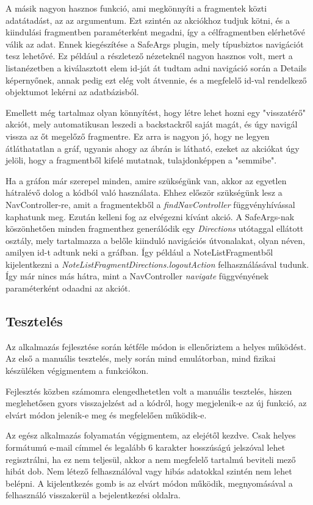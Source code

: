 A másik nagyon hasznos funkció, ami megkönnyíti a fragmentek közti adatátadást, az az argumentum. Ezt szintén az akciókhoz tudjuk kötni, és a kiindulási fragmentben paraméterként megadni, így a célfragmentben elérhetővé válik az adat. Ennek kiegészítése a SafeArgs plugin, mely típusbiztos navigációt tesz lehetővé. Ez például a részletező nézeteknél nagyon hasznos volt, mert a listanézetben a kiválasztott elem id-ját át tudtam adni navigáció során a Details képernyőnek, annak pedig ezt elég volt átvennie, és a megfelelő id-val rendelkező objektumot lekérni az adatbázisból. 

Emellett még tartalmaz olyan könnyítést, hogy létre lehet hozni egy "visszatérő" akciót, mely automatikusan leszedi a backstackről saját magát, és úgy navigál vissza az őt megelőző fragmentre. Ez arra is nagyon jó, hogy ne legyen átláthatatlan a gráf, ugyanis ahogy az ábrán is látható, ezeket az akciókat úgy jelöli, hogy a fragmentből kifelé mutatnak, tulajdonképpen a "semmibe".

Ha a gráfon már szerepel minden, amire szükségünk van, akkor az egyetlen hátralévő dolog a kódból való használata. Ehhez először szükségünk lesz a NavController-re, amit a fragmentekből a \emph{findNavController} függvényhívással kaphatunk meg. Ezután kelleni fog az elvégezni kívánt akció. A SafeArgs-nak köszönhetően minden fragmenthez generálódik egy \emph{Directions} utótaggal ellátott osztály, mely tartalmazza a belőle kiinduló navigációs útvonalakat, olyan néven, amilyen id-t adtunk neki a gráfban. Így például a NoteListFragmentből kijelentkezni a \emph{NoteListFragmentDirections.logoutAction} felhasználásával tudunk. Így már nincs más hátra, mint a NavController \emph{navigate} függvényének paraméterként odaadni az akciót.

\subsection{Tesztelés}
Az alkalmazás fejlesztése során kétféle módon is ellenőriztem a helyes működést. Az első a manuális tesztelés, mely során mind emulátorban, mind fizikai készüléken végigmentem a funkciókon.

Fejlesztés közben számomra elengedhetetlen volt a manuális tesztelés, hiszen meglehetősen gyors visszajelzést ad a kódról, hogy megjelenik-e az új funkció, az elvárt módon jelenik-e meg és megfelelően működik-e. 

Az egész alkalmazás folyamatán végigmentem, az elejétől kezdve. Csak helyes formátumú e-mail címmel és legalább 6 karakter hosszúságú jelszóval lehet regisztrálni, ha ez nem teljesül, akkor a nem megfelelő tartalmú beviteli mező hibát dob. Nem létező felhasználóval vagy hibás adatokkal szintén nem lehet belépni. A kijelentkezés gomb is az elvárt módon működik, megnyomásával a felhasználó visszakerül a bejelentkezési oldalra. 

